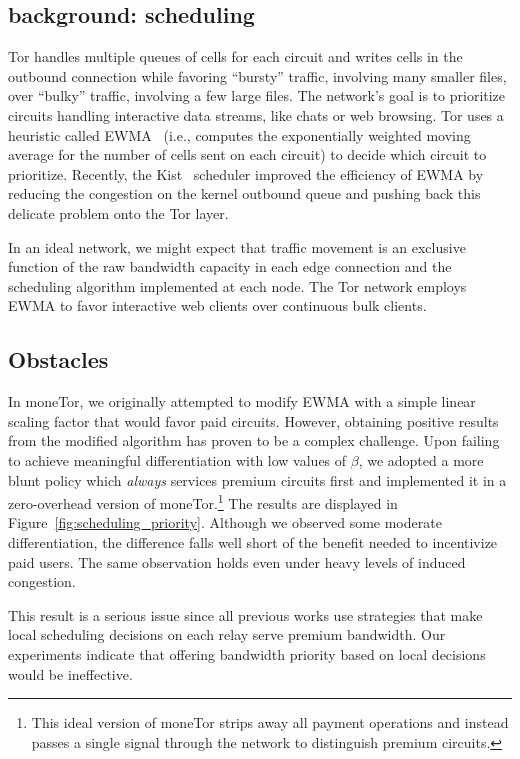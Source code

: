 \subsection{background: scheduling}

Tor handles multiple queues of cells for each circuit and writes cells in the outbound connection while favoring ``bursty'' traffic, involving many smaller files, over ``bulky'' traffic, involving a few large files.
The network's goal is to prioritize circuits handling interactive data streams, like chats or web browsing.
Tor uses a heuristic called EWMA~\cite{tang2010improved} (i.e., computes the exponentially weighted moving average for the number of cells sent on each circuit) to decide which circuit to prioritize.
Recently, the Kist~\cite{jansen2014never} scheduler improved the efficiency of EWMA by reducing the congestion on the kernel outbound queue and pushing back this delicate problem onto the Tor layer.

In an ideal network, we might expect that traffic movement is an exclusive function of the raw bandwidth capacity in each edge connection and the scheduling algorithm implemented at each node.
The Tor network employs EWMA to favor interactive web clients over continuous bulk clients.

\subsection{Obstacles}

In moneTor, we originally attempted to modify EWMA with a simple linear scaling factor that would favor paid circuits.
However, obtaining positive results from the modified algorithm has proven to be a complex challenge.
Upon failing to achieve meaningful differentiation with low values of $\beta$, we adopted a more blunt policy which \emph{always} services premium circuits first and implemented it in a zero-overhead version of moneTor.\footnote{This ideal version of moneTor strips away all payment operations and instead passes a single signal through the network to distinguish premium circuits.}
The results are displayed in Figure~\ref{fig:scheduling_priority}.
Although we observed some moderate differentiation, the difference falls well short of the benefit needed to incentivize paid users.
The same observation holds even under heavy levels of induced congestion.

This result is a serious issue since all previous works use strategies that make local scheduling decisions on each relay serve premium bandwidth.
Our experiments indicate that offering bandwidth priority based on local decisions would be ineffective.

